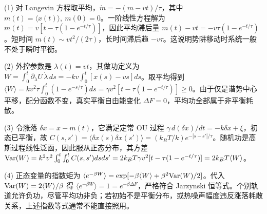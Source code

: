 (1) 对 Langevin 方程取平均，\(\dot m=-(m-vt)/\tau\)，其中 \(m(t)=\langle x(t)\rangle,\ m(0)=0\)。一阶线性方程解为 \(m(t)=v[t-\tau(1-e^{-t/\tau})]\)，因此平均滞后量 \(m(t)-vt=-v\tau(1-e^{-t/\tau})\)。短时间 \(m(t)\sim vt^2/(2\tau)\)，长时间滞后趋 \(-v\tau\)。这说明势阱移动时系统一般不处于瞬时平衡。

(2) 外控参数是 \(\lambda(t)=vt\)，其做功定义为 \(W=\int_0^t\partial_\lambda U\,\dot\lambda\,ds=-kv\int_0^t[x(s)-vs]ds\)。取平均得到 \(\langle W\rangle=kv^2\tau\int_0^t(1-e^{-s/\tau})ds=\gamma v^2[t-\tau(1-e^{-t/\tau})]\ge0\)。由于仅是谐势中心平移，配分函数不变，真实平衡自由能变化 \(\Delta F=0\)，平均功全部属于非平衡耗散。

(3) 令涨落 \(\delta x=x-m(t)\)，它满足定常 OU 过程 \(\gamma\,d(\delta x)/dt=-k\delta x+\xi\)，初态已平衡，故 \(C(s,s')=\langle\delta x(s)\delta x(s')\rangle=(k_BT/k)e^{-|s-s'|/\tau}\)。随机功是高斯过程线性泛函，因此服从正态分布，其方差 \({\rm Var}(W)=k^2v^2\int_0^t\int_0^t C(s,s')dsds'=2k_BT\gamma v^2[t-\tau(1-e^{-t/\tau})]=2k_BT\langle W\rangle\)。

(4) 正态变量的指数矩为 \(\langle e^{-\beta W}\rangle=\exp[-\beta\langle W\rangle+\beta^2{\rm Var}(W)/2]\)。代入 \({\rm Var}(W)=2\langle W\rangle/\beta\) 得 \(\langle e^{-\beta W}\rangle=1=e^{-\beta\Delta F}\)，严格符合 Jarzynski 恒等式。个别轨道允许负功，尽管平均功非负；若初始不是平衡分布，或热噪声幅度违反涨落耗散关系，上述指数等式通常不能直接照用。
